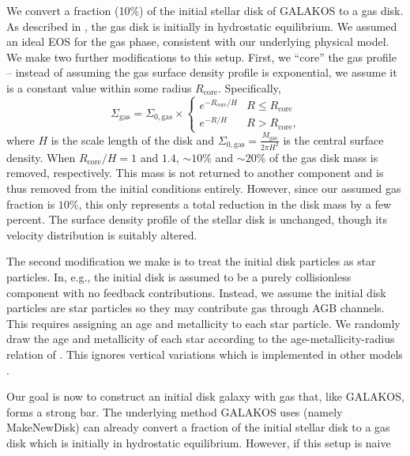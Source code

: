 \documentclass[a4paper,fleqn,usenatbib]{mnras}
\newcommand{\beq}{\begin{equation}}
\newcommand{\eeq}{\end{equation}}
\begin{document}
We convert a fraction (10\%) of the initial stellar disk of GALAKOS to a gas
disk. As described in \citet{2005MNRAS.361..776S}, the gas disk is initially
in hydrostatic equilibrium. We assumed an ideal EOS for the gas phase,
consistent with our underlying physical model. We make two further
modifications to this setup. First, we ``core'' the gas profile -- instead of
assuming the gas surface density profile is exponential, we assume it is a
constant value within some radius $R_{\text{core}}$. Specifically,
\beq
\Sigma_{\text{gas}} = \Sigma_{0,\text{gas}} \times \begin{cases} 
      e^{-R_{\text{core}}/H} & R \leq R_{\text{core}} \\
      e^{-R/H} & R > R_{\text{core}}\text{,}
   \end{cases}
\eeq
where $H$ is the scale length of the disk and $\Sigma_{0,\text{gas}} =
\frac{M_{\text{gas}}}{2\pi H^2}$ is the central surface density. When
$R_{\text{core}}/H=1$ and $1.4$, $\sim10\%$ and $\sim20\%$ of the gas disk
mass is removed, respectively. This mass is not returned to another component
and is thus removed from the initial conditions entirely. However, since our
assumed gas fraction is $10\%$, this only represents a total reduction in the
disk mass by a few percent. The surface density profile of the stellar disk is
unchanged, though its velocity distribution is suitably altered.

The second modification we make is to treat the initial disk particles as star
particles. In, e.g., \citet{2019MNRAS.489.4233M} the initial disk is assumed
to be a purely collisionless component with no feedback contributions.
Instead, we assume the initial disk particles are star particles so they may
contribute gas through AGB channels. This requires assigning an age and
metallicity to each star particle. We randomly draw the age and metallicity of
each star according to the age-metallicity-radius relation of
\citet{2018ApJ...865...96F}. This ignores vertical variations which is
implemented in other models \citep[e.g.][]{2020arXiv200503646S}.

Our goal is now to construct an initial disk galaxy with gas that, like
GALAKOS, forms a strong bar. The underlying method GALAKOS uses (namely
MakeNewDisk) can already convert a fraction of the initial stellar disk to a
gas disk which is initially in hydrostatic equilibrium. However, if this setup
is naive


\end{document}
